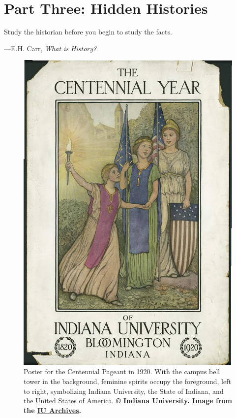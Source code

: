 \documentclass[
  american,
  letterpaper,
]{scrreprt}
\begin{document}

\chapter*{Part Three: Hidden Histories}\label{sec-partthree}


\epigraph{
Study the historian before you begin to study the facts.  
}
{---E.H. Carr, \textit{What is History?}}

\begin{figure}[H]

{\centering \includegraphics[width=0.6\linewidth,height=\textheight,keepaspectratio]{images/centennialrev.jpg}

}

\caption[Poster for the Centennial Pageant in 1920]{Poster for the
Centennial Pageant in 1920. With the campus bell tower in the
background, feminine spirits occupy the foreground, left to right,
symbolizing Indiana University, the State of Indiana, and the United
States of America. \textbf{© Indiana University. Image from the
\href{https://libraries.indiana.edu/university-archives}{IU Archives}.}}

\end{figure}%

\end{document}
